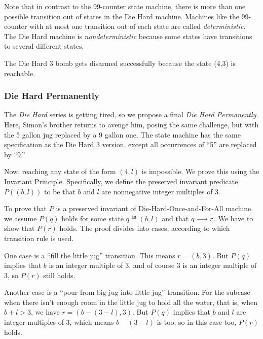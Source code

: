 Note that in contrast to the 99-counter state machine, there is more than
one possible transition out of states in the Die Hard machine.  Machines
like the 99-counter with at most one transition out of each state are
called \emph{deterministic}.  The Die Hard machine is
\emph{nondeterministic} because some states have transitions to several
different states.

The Die Hard 3 bomb gets disarmed successfully because the state (4,3)
is reachable.



\subsubsection{Die Hard Permanently}
The \emph{Die Hard} series is getting tired, so we propose a final
\emph{Die Hard Permanently}.  Here, Simon's brother returns to
avenge him, posing the same challenge, but with the 5 gallon jug
replaced by a 9 gallon one.  The state machine has the same
specification as the Die Hard 3 version, except all occurrences of
``5'' are replaced by ``9.''

Now, reaching any state of the form $(4,l)$ is impossible.  We prove
this using the Invariant Principle.  Specifically, we define the
preserved invariant predicate $P((b,l))$ to be that $b$ and $l$ are
nonnegative integer multiples of 3.

To prove that $P$ is a preserved invariant of Die-Hard-Once-and-For-All
machine, we assume $P(q)$ holds for some state $q \eqdef (b,l)$ and that
$q \mathrel{\longrightarrow} r$.  We have to show that $P(r)$ holds.  The proof divides
into cases, according to which transition rule is used.

One case is a ``fill the little jug'' transition.  This means $r =
(b,3)$.  But $P(q)$ implies that $b$ is an integer multiple of 3, and
of course 3 is an integer multiple of 3, so $P(r)$ still holds.

Another case is a ``pour from big jug into little jug'' transition.
For the subcase when there isn't enough room in the little jug to hold
all the water, that is, when $b + l > 3$, we have $r = (b -( 3 -l), 3)$.
But $P(q)$ implies that $b$ and $l$ are integer multiples of 3, which
means $b -( 3 -l)$ is too, so in this case too, $P(r)$ holds.

